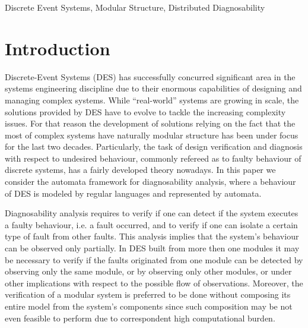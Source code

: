 \documentclass[letterpaper, 10pt, conference]{ieeeconf}
\begin{document}
\begin{keywords}
Discrete Event Systems, Modular Structure, Distributed Diagnosability
\end{keywords}

\newtheorem{assumption}{Assumption}
\newtheorem{definition}{Definition}
\newtheorem{conjecture}{Conjecture}
\newtheorem{lemma}{Lemma}
\newtheorem{corollary}{Corollary}
\newtheorem{example}{Example}
\newtheorem{theorem}{Theorem}

\section{Introduction}

Discrete-Event Systems (DES) has successfully concurred significant area in the
systems engineering discipline due to their enormous capabilities of designing
and managing complex systems. While ``real-world'' systems are growing in scale,
the solutions provided by DES have to evolve to tackle the increasing complexity
issues. For that reason the development of solutions relying on the fact that
the most of complex systems have naturally modular structure has been under
focus for the last two decades. Particularly, the task of design verification
and diagnosis with respect to undesired behaviour, commonly refereed as to
faulty behaviour of discrete systems, has a fairly developed theory nowadays.
In this paper we consider the automata framework for diagnosability analysis,
where a behaviour of DES is modeled by regular languages and represented by
automata.

Diagnosability analysis requires to verify if one can detect if the system
executes a faulty behaviour, i.e. a fault occurred, and to verify if one
can isolate a certain type of fault from other faults. This analysis implies
that the system's behaviour can be observed only partially. In DES built from
more then one modules it may be necessary to verify if the faults originated
from one module can be detected by observing only the same module, or by
observing only other modules, or under other implications with respect to the
possible flow of observations. Moreover, the verification of a modular system is
preferred to be done without composing its entire model from the system's
components since such composition may be not even feasible to perform due to 
correspondent high computational burden.
\end{document}

